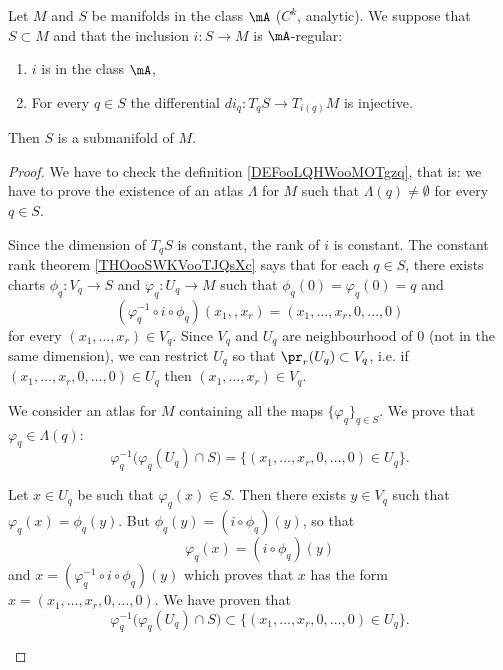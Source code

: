 \begin{proposition}     \label{PROPooZACHooCNgLSl}
	Let \( M\) and \( S\) be manifolds in the class \( \mA\) (\( C^k\), analytic). We suppose that \( S\subset M\) and that the inclusion \(i \colon S\to M  \) is \( \mA\)-regular:
	\begin{enumerate}
		\item
		      \( i\) is in the class \( \mA\),
		\item
		      For every \( q\in S\) the differential \(di_q \colon T_qS\to T_{i(q)}M  \) is injective.
	\end{enumerate}
	Then \( S\) is a submanifold of \( M\).
\end{proposition}

\begin{proof}
	We have to check the definition \ref{DEFooLQHWooMOTgzq}, that is: we have to prove the existence of an atlas \( \Lambda\) for \( M\) such that \( \Lambda(q)\neq \emptyset\) for every \( q\in S\).

	Since the dimension of \( T_qS\) is constant, the rank of \( i\) is constant. The constant rank theorem \ref{THOooSWKVooTJQsXc} says that for each \( q\in S\), there exists charts \(\phi_q \colon V_q\to S  \) and \(\varphi_q \colon U_q\to M  \) such that \( \phi_q(0)=\varphi_q(0)=q\) and
	\begin{equation}
		(\varphi_q^{-1}\circ i\circ\phi_q)(x_1,,x_r)=(x_1,\ldots,x_r,0,\ldots,0)
	\end{equation}
	for every \( (x_1,\ldots,x_r)\in V_q\). Since \( V_q\) and \( U_q\) are neighbourhood of \( 0\) (not in the same dimension), we can restrict \( U_q\) so that \( \pr_r(U_q)\subset V_q\), i.e. if \( (x_1,\ldots,x_r,0,\ldots,0)\in U_q\) then \( (x_1,\ldots,x_r)\in V_q\).

	We consider an atlas for \( M\) containing all the maps \( \{ \varphi_q \}_{q\in S}\). We prove that \( \varphi_q\in \Lambda(q)\):
	\begin{equation}
		\varphi_q^{-1}\big( \varphi_q(U_q)\cap S \big)=\{ (x_1,\ldots,x_r,0,\ldots,0)\in U_{q} \}.
	\end{equation}

	\begin{subproof}
		Let \( x\in U_q\) be such that \( \varphi_q(x)\in S\). Then there exists \( y\in V_q\) such that \( \varphi_q(x)=\phi_q(y)\). But \( \phi_q(y)=(i\circ \phi_q)(y)\), so that
		\begin{equation}
			\varphi_q(x)=(i\circ \phi_q)(y)
		\end{equation}
		and \( x=(\varphi_q^{-1}\circ i\circ \phi_q)(y)\) which proves that \( x\) has the form \( x=(x_1,\ldots,x_r,0,\ldots,0)\). We have proven that
		\begin{equation}
			\varphi_q^{-1}\big( \varphi_q(U_q)\cap S \big)\subset\{ (x_1,\ldots,x_r,0,\ldots,0)\in U_q \}.
		\end{equation}


\end{subproof}
\end{proof}
